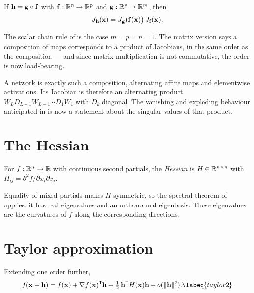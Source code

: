 \begin{theorem}
If \(\mathbf{h}=\mathbf{g}\circ\mathbf{f}\) with \(\mathbf{f}:\mathbb{R}^{n}\to\mathbb{R}^{p}\) and
\(\mathbf{g}:\mathbb{R}^{p}\to\mathbb{R}^{m}\), then
\[
	J_{\mathbf{h}}(\mathbf{x})=J_{\mathbf{g}}\bigl(\mathbf{f}(\mathbf{x})\bigr)\,J_{\mathbf{f}}(\mathbf{x}).
\]
\end{theorem}

The scalar chain rule of  is the case \(m=p=n=1\). The
matrix version says a composition of maps corresponds to a product of Jacobians,
in the same order as the composition --- and since matrix multiplication is not
commutative, the order is now load-bearing.

\begin{remark}
A network is exactly such a composition, alternating affine maps and elementwise
activations. Its Jacobian is therefore an alternating product
\(W_L D_{L-1} W_{L-1}\cdots D_1 W_1\) with \(D_k\) diagonal. The vanishing and
exploding behaviour anticipated in  is now a statement
about the singular values of that product.
\end{remark}

\section{The Hessian}

\begin{definition}
For \(f:\mathbb{R}^{n}\to\mathbb{R}\) with continuous second partials, the \emph{Hessian} is
\(H\in\mathbb{R}^{n\times n}\) with \(H_{ij}=\partial^{2}f/\partial x_i\partial x_j\).
\end{definition}

Equality of mixed partials makes \(H\) symmetric, so the spectral theorem of
 applies: it has real eigenvalues and an orthonormal
eigenbasis. Those eigenvalues are the curvatures of \(f\) along the
corresponding directions.

\section{Taylor approximation}

Extending  one order further,
\begin{equation}
	f(\vect{x}+\vect{h})=f(\vect{x})+\nabla f(\vect{x})\tp\vect{h}
	+\tfrac12\,\vect{h}\tp H(\vect{x})\vect{h}+o(\lVert\vect{h}\rVert^{2}).
	\labeq{taylor2}
\end{equation}

